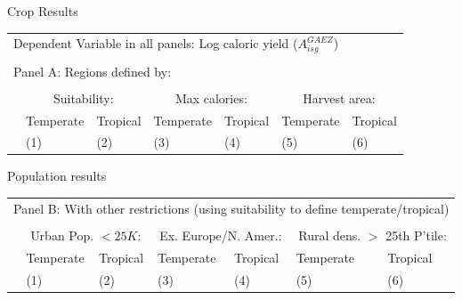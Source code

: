 \documentclass[10pt, xcolor=dvipsnames]{beamer}
\begin{document}
\begin{frame}{Crop Results}

{\footnotesize
\begin{tabularx}{\textwidth}{lXXXXXX}
\midrule
\multicolumn{7}{l}{Dependent Variable in all panels: Log caloric yield ($A^{GAEZ}_{isg}$)} \\ \\
\multicolumn{7}{l}{Panel A: Regions defined by:} \\ \\
 & \multicolumn{2}{c}{Suitability:} & \multicolumn{2}{c}{Max calories:} & \multicolumn{2}{c}{Harvest area:}\\ \cmidrule(lr){2-3} \cmidrule(lr){4-5} \cmidrule(lr){6-7} 
 & Temperate & Tropical & Temperate  & Tropical  & Temperate  & Tropical \\
 & (1) & (2) & (3) & (4) & (5) & (6) \\
\midrule

\midrule
\end{tabularx}
}
\end{frame}

\begin{frame}{Population results}\label{popreg}
{\footnotesize
\begin{tabularx}{\textwidth}{lXXXXXX}
\midrule
\multicolumn{7}{l}{Panel B: With other restrictions (using suitability to define temperate/tropical)} \\ \\
 & \multicolumn{2}{c}{Urban Pop. $<25K$:} & \multicolumn{2}{c}{Ex. Europe/N. Amer.:} & \multicolumn{2}{c}{Rural dens. $>$ 25th P'tile:}\\ \cmidrule(lr){2-3} \cmidrule(lr){4-5} \cmidrule(lr){6-7}
 & Temperate & Tropical & Temperate  & Tropical  & Temperate  & Tropical \\
 & (1) & (2) & (3) & (4) & (5) & (6) \\
\midrule

\midrule
\end{tabularx}
}

\hfill \hyperlink{pop}{}
\end{frame}
\end{document}

